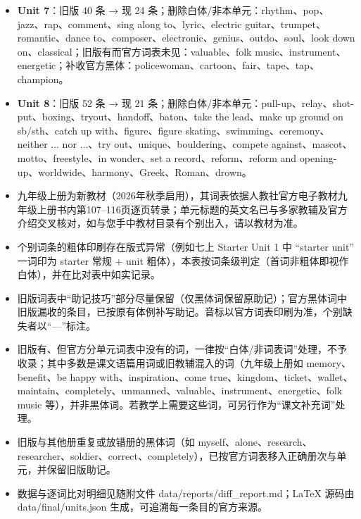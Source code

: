 \documentclass[UTF8,a4paper,11pt,oneside]{ctexbook}
\begin{document}
\begin{itemize}[leftmargin=2.2em,itemsep=0.25ex,topsep=0.3ex,label={\textcolor{mainblue}{\small\textbullet}}]
\item \textbf{\textcolor{mainblue}{Unit 7}}：旧版 40 条 → 现 24 条；删除白体/非本单元：rhythm、pop、jazz、rap、comment、sing along to、lyric、electric guitar、trumpet、romantic、dance to、composer、electronic、genius、outdo、soul、look down on、classical；旧版有而官方词表未见：valuable、folk music、instrument、energetic；补收官方黑体：policewoman、cartoon、fair、tape、tap、champion。
\item \textbf{\textcolor{mainblue}{Unit 8}}：旧版 52 条 → 现 21 条；删除白体/非本单元：pull-up、relay、shot-put、boxing、tryout、handoff、baton、take the lead、make up ground on sb/sth、catch up with、figure、figure skating、swimming、ceremony、neither ... nor ...、try out、unique、bouldering、compete against、mascot、motto、freestyle、in wonder、set a record、reform、reform and opening-up、worldwide、harmony、Greek、Roman、drown。
\end{itemize}
\par\addvspace{0.75em}\par
\vspace{0.12em}\noindent{\color{rulelight}\rule{\linewidth}{0.55pt}}\par
\addvspace{0.2em}
\begin{itemize}[leftmargin=2.2em,itemsep=0.25ex,topsep=0.3ex,label={\textcolor{mainblue}{\small\textbullet}}]
\item 九年级上册为新教材（2026年秋季启用），其词表依据人教社官方电子教材九年级上册书内第107–116页逐页转录；单元标题的英文名已与多家教辅及官方介绍交叉核对，如与您手中教材目录有个别出入，请以教材为准。
\item 个别词条的粗体印刷存在版式异常（例如七上 Starter Unit 1 中 “starter unit” 一词印为 starter 常规 + unit 粗体），本表按词条级判定（首词非粗体即视作白体），并在比对表中如实记录。
\item 旧版词表中“助记技巧”部分尽量保留（仅黑体词保留原助记）；官方黑体词中旧版漏收的条目，已按原有体例补写助记。音标以官方词表印刷为准，个别缺失者以“—”标注。
\item 旧版有、但官方分单元词表中没有的词，一律按“白体/非词表词”处理，不予收录；其中多数是课文语篇用词或旧教辅混入的词（九年级上册如 memory、benefit、be happy with、inspiration、come true、kingdom、ticket、wallet、maintain、completely、unmanned、valuable、instrument、energetic、folk music 等），并非黑体词。若教学上需要这些词，可另行作为“课文补充词”处理。
\item 旧版与其他册重复或放错册的黑体词（如 myself、alone、research、researcher、soldier、correct、completely），已按官方词表移入正确册次与单元，并保留旧版助记。
\item 数据与逐词比对明细见随附文件 data/reports/diff\_report.md；LaTeX 源码由 data/final/units.json 生成，可追溯每一条目的官方来源。
\end{itemize}
\end{document}
